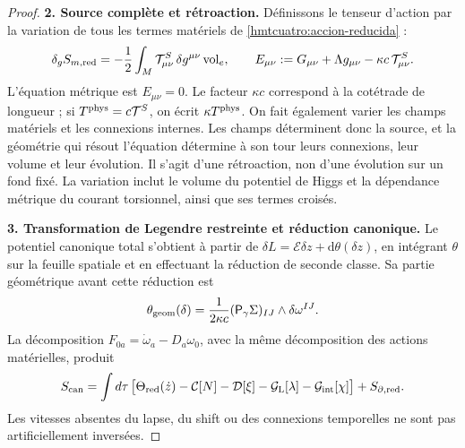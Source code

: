 \begin{proof}
\par\medskip\noindent\textbf{2. Source complète et rétroaction.}\quad
Définissons le tenseur d’action par la variation de tous les termes matériels de \eqref{hmtcuatro:accion-reducida} :
\begin{equation}
 \delta_g S_{m,\rm red}=-\frac12\int_M
       \mathcal T^S_{\mu\nu}\,\delta g^{\mu\nu}\operatorname{vol}_e,
 \qquad
 E_{\mu\nu}:=G_{\mu\nu}+\Lambda g_{\mu\nu}
                   -\kappa c\,\mathcal T^S_{\mu\nu}.
 \label{hmtcuatro:fuente-completa}
\end{equation}
L’équation métrique est \(E_{\mu\nu}=0\). Le facteur \(\kappa c\) correspond à la cotétrade de longueur ; si \(T^{\rm phys}=c\mathcal T^S\), on écrit \(\kappa T^{\rm phys}\). On fait également varier les champs matériels et les connexions internes. Les champs déterminent donc la source, et la géométrie qui résout l’équation détermine à son tour leurs connexions, leur volume et leur évolution. Il s’agit d’une rétroaction, non d’une évolution sur un fond fixé. La variation inclut le volume du potentiel de Higgs et la dépendance métrique du courant torsionnel, ainsi que ses termes croisés.

\par\medskip\noindent\textbf{3. Transformation de Legendre restreinte et réduction canonique.}\quad
Le potentiel canonique total s’obtient à partir de \(\delta L=\mathcal E\delta z+\mathrm d\theta(\delta z)\), en intégrant \(\theta\) sur la feuille spatiale et en effectuant la réduction de seconde classe. Sa partie géométrique avant cette réduction est
\[
 \theta_{\rm geom}(\delta)=
   \frac1{2\kappa c}(\mathsf P_\gamma\Sigma)_{IJ}
                       \wedge\delta\omega^{IJ}.
\]
La décomposition \(F_{0a}=\dot\omega_a-D_a\omega_0\), avec la même décomposition des actions matérielles, produit
\begin{equation}
 S_{\rm can}=\int d\tau\,
 \bigl[\Theta_{\rm red}(\dot z)-\mathcal C[N]-\mathcal D[\xi]
       -\mathcal G_{\rm L}[\lambda]-\mathcal G_{\rm int}[\chi]\bigr]
       +S_{\partial,\rm red}.
 \label{hmtcuatro:legendre-total}
\end{equation}
Les vitesses absentes du lapse, du shift ou des connexions temporelles ne sont pas artificiellement inversées.


\end{proof}
